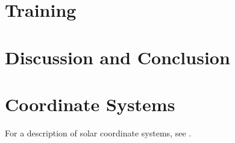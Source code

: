 \documentclass[11pt,a4paper,onecolumn]{report}
\begin{document}
\chapter{Training}












%
%
%
%
%
\chapter{Discussion and Conclusion}
\label{chap:discussion}
%
%
%
%
%

















\appendix

\chapter{Coordinate Systems}
For a description of solar coordinate systems, see
\citet{thompson_w_t_coordinate_2006}.
\end{document}
